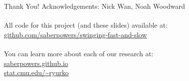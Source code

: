\documentclass{beamer}
\begin{document}
\begin{frame}{Thank You!}
  Acknowledgements: Nick Wan, Noah Woodward\\
  ~\\
  All code for this project (and these slides) available at:\\
  \alert{\url{github.com/saberpowers/swinging-fast-and-slow}}\\
  ~\\
  You can learn more about each of our research at:\\
  \alert{
    \url{saberpowers.github.io}\\
    \url{stat.cmu.edu/~ryurko}
  }
\end{frame}
\end{document}
